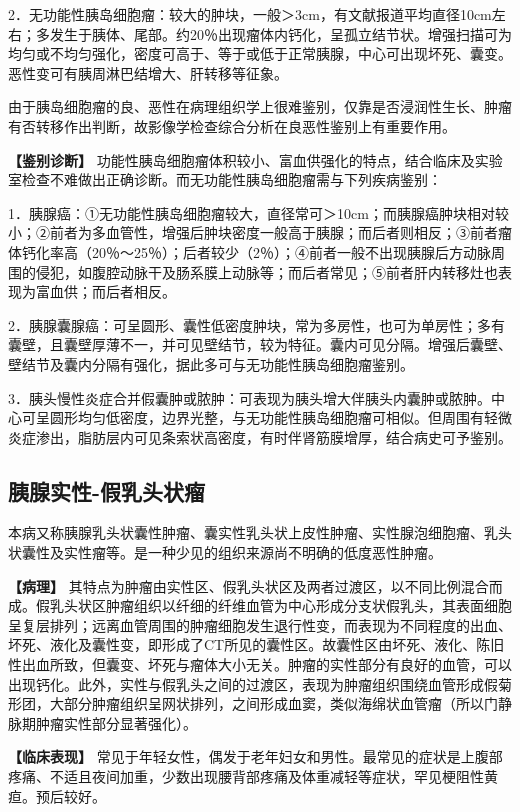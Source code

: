 2．无功能性胰岛细胞瘤：较大的肿块，一般＞3cm，有文献报道平均直径10cm左右；多发生于胰体、尾部。约20％出现瘤体内钙化，呈孤立结节状。增强扫描可为均匀或不均匀强化，密度可高于、等于或低于正常胰腺，中心可出现坏死、囊变。恶性变可有胰周淋巴结增大、肝转移等征象。

由于胰岛细胞瘤的良、恶性在病理组织学上很难鉴别，仅靠是否浸润性生长、肿瘤有否转移作出判断，故影像学检查综合分析在良恶性鉴别上有重要作用。

\textbf{【鉴别诊断】}
功能性胰岛细胞瘤体积较小、富血供强化的特点，结合临床及实验室检查不难做出正确诊断。而无功能性胰岛细胞瘤需与下列疾病鉴别：

1．胰腺癌：①无功能性胰岛细胞瘤较大，直径常可＞10cm；而胰腺癌肿块相对较小；②前者为多血管性，增强后肿块密度一般高于胰腺；而后者则相反；③前者瘤体钙化率高（20％～25％）；后者较少（2％）；④前者一般不出现胰腺后方动脉周围的侵犯，如腹腔动脉干及肠系膜上动脉等；而后者常见；⑤前者肝内转移灶也表现为富血供；而后者相反。

2．胰腺囊腺癌：可呈圆形、囊性低密度肿块，常为多房性，也可为单房性；多有囊壁，且囊壁厚薄不一，并可见壁结节，较为特征。囊内可见分隔。增强后囊壁、壁结节及囊内分隔有强化，据此多可与无功能性胰岛细胞瘤鉴别。

3．胰头慢性炎症合并假囊肿或脓肿：可表现为胰头增大伴胰头内囊肿或脓肿。中心可呈圆形均匀低密度，边界光整，与无功能性胰岛细胞瘤可相似。但周围有轻微炎症渗出，脂肪层内可见条索状高密度，有时伴肾筋膜增厚，结合病史可予鉴别。

\subsection{胰腺实性-假乳头状瘤}

本病又称胰腺乳头状囊性肿瘤、囊实性乳头状上皮性肿瘤、实性腺泡细胞瘤、乳头状囊性及实性瘤等。是一种少见的组织来源尚不明确的低度恶性肿瘤。

\textbf{【病理】}
其特点为肿瘤由实性区、假乳头状区及两者过渡区，以不同比例混合而成。假乳头状区肿瘤组织以纤细的纤维血管为中心形成分支状假乳头，其表面细胞呈复层排列；远离血管周围的肿瘤细胞发生退行性变，而表现为不同程度的出血、坏死、液化及囊性变，即形成了CT所见的囊性区。故囊性区由坏死、液化、陈旧性出血所致，但囊变、坏死与瘤体大小无关。肿瘤的实性部分有良好的血管，可以出现钙化。此外，实性与假乳头之间的过渡区，表现为肿瘤组织围绕血管形成假菊形团，大部分肿瘤组织呈网状排列，之间形成血窦，类似海绵状血管瘤（所以门静脉期肿瘤实性部分显著强化）。

\textbf{【临床表现】}
常见于年轻女性，偶发于老年妇女和男性。最常见的症状是上腹部疼痛、不适且夜间加重，少数出现腰背部疼痛及体重减轻等症状，罕见梗阻性黄疸。预后较好。

